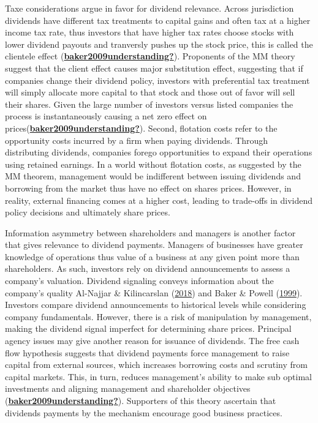 \documentclass[12pt,preprint, authoryear]{elsarticle}
\numberwithin{equation}{section}
\numberwithin{figure}{section}
\numberwithin{table}{section}
\begin{document}
Taxe considerations argue in favor for dividend relevance. Across
jurisdiction dividends have different tax treatments to capital gains
and often tax at a higher income tax rate, thus investors that have
higher tax rates choose stocks with lower dividend payouts and
tranversly pushes up the stock price, this is called the clientele
effect
(\protect\hyperlink{ref-baker2009understanding}{\textbf{baker2009understanding?}}).
Proponents of the MM theory suggest that the client effect causes major
substitution effect, suggesting that if companies change their dividend
policy, investors with preferential tax treatment will simply allocate
more capital to that stock and those out of favor will sell their
shares. Given the large number of investors versus listed companies the
process is instantaneously causing a net zero effect on
prices(\protect\hyperlink{ref-baker2009understanding}{\textbf{baker2009understanding?}}).
Second, flotation costs refer to the opportunity costs incurred by a
firm when paying dividends. Through distributing dividends, companies
forego opportunities to expand their operations using retained earnings.
In a world without flotation costs, as suggested by the MM theorem,
management would be indifferent between issuing dividends and borrowing
from the market thus have no effect on shares prices. However, in
reality, external financing comes at a higher cost, leading to
trade-offs in dividend policy decisions and ultimately share prices.

Information asymmetry between shareholders and managers is another
factor that gives relevance to dividend payments. Managers of businesses
have greater knowledge of operations thus value of a business at any
given point more than shareholders. As such, investors rely on dividend
announcements to assess a company's valuation. Dividend signaling
conveys information about the company's quality Al-Najjar \&
Kilincarslan (\protect\hyperlink{ref-al2018revisiting}{2018}) and Baker
\& Powell (\protect\hyperlink{ref-baker1999corporate}{1999}). Investors
compare dividend announcements to historical levels while considering
company fundamentals. However, there is a risk of manipulation by
management, making the dividend signal imperfect for determining share
prices. Principal agency issues may give another reason for issuance of
dividends. The free cash flow hypothesis suggests that dividend payments
force management to raise capital from external sources, which increases
borrowing costs and scrutiny from capital markets. This, in turn,
reduces management's ability to make sub optimal investments and
aligning management and shareholder objectives
(\protect\hyperlink{ref-baker2009understanding}{\textbf{baker2009understanding?}}).
Supporters of this theory ascertain that dividends payments by the
mechanism encourage good business practices.
\end{document}
